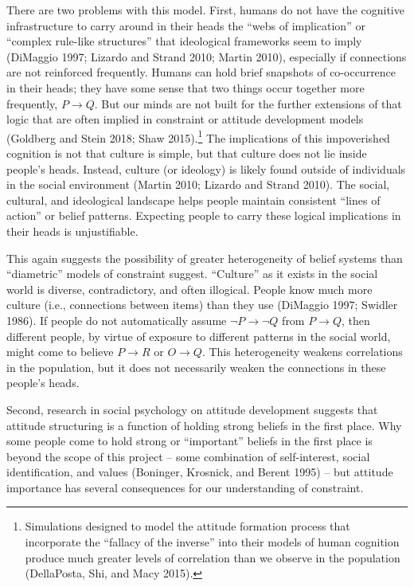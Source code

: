 \documentclass[12pt,]{article}
\begin{document}
There are two problems with this model. First, humans do not have the cognitive infrastructure to carry around in their heads the ``webs of implication'' or ``complex rule-like structures'' that ideological frameworks seem to imply (DiMaggio 1997; Lizardo and Strand 2010; Martin 2010), especially if connections are not reinforced frequently. Humans can hold brief snapshots of co-occurrence in their heads; they have some sense that two things occur together more frequently, \(P \to Q\). But our minds are not built for the further extensions of that logic that are often implied in constraint or attitude development models (Goldberg and Stein 2018; Shaw 2015).\footnote{Simulations designed to model the attitude formation process that incorporate the ``fallacy of the inverse'' into their models of human cognition produce much greater levels of correlation than we observe in the population (DellaPosta, Shi, and Macy 2015).} The implications of this impoverished cognition is not that culture is simple, but that culture does not lie inside people's heads. Instead, culture (or ideology) is likely found outside of individuals in the social environment (Martin 2010; Lizardo and Strand 2010). The social, cultural, and ideological landscape helps people maintain consistent ``lines of action'' or belief patterns. Expecting people to carry these logical implications in their heads is unjustifiable.

This again suggests the possibility of greater heterogeneity of belief systems than ``diametric'' models of constraint suggest. ``Culture'' as it exists in the social world is diverse, contradictory, and often illogical. People know much more culture (i.e., connections between items) than they use (DiMaggio 1997; Swidler 1986). If people do not automatically assume \(\lnot P \to \lnot Q\) from \(P \to Q\), then different people, by virtue of exposure to different patterns in the social world, might come to believe \(P \to R\) or \(O \to Q\). This heterogeneity weakens correlations in the population, but it does not necessarily weaken the connections in these people's heads.

Second, research in social psychology on attitude development suggests that attitude structuring is a function of holding strong beliefs in the first place. Why some people come to hold strong or ``important'' beliefs in the first place is beyond the scope of this project -- some combination of self-interest, social identification, and values (Boninger, Krosnick, and Berent 1995) -- but attitude importance has several consequences for our understanding of constraint.
\end{document}
